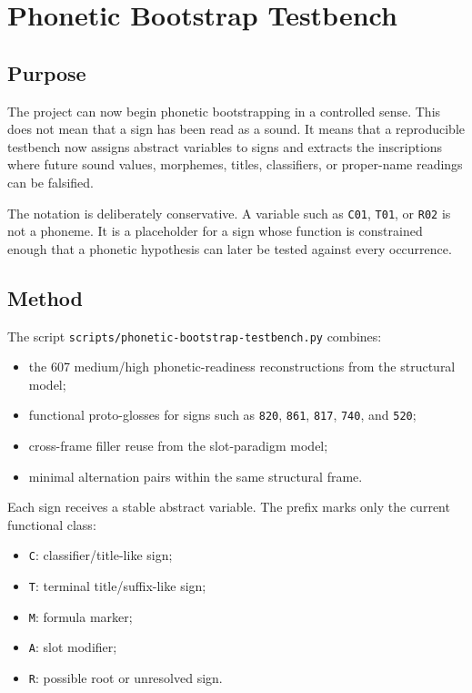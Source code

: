 \section{Phonetic Bootstrap Testbench}

\subsection{Purpose}

The project can now begin phonetic bootstrapping in a controlled sense. This does not mean that a sign has been read as a sound. It means that a reproducible testbench now assigns abstract variables to signs and extracts the inscriptions where future sound values, morphemes, titles, classifiers, or proper-name readings can be falsified.

The notation is deliberately conservative. A variable such as \texttt{C01}, \texttt{T01}, or \texttt{R02} is not a phoneme. It is a placeholder for a sign whose function is constrained enough that a phonetic hypothesis can later be tested against every occurrence.

\subsection{Method}

The script \texttt{scripts/phonetic-bootstrap-testbench.py} combines:

\begin{itemize}
  \item the 607 medium/high phonetic-readiness reconstructions from the structural model;
  \item functional proto-glosses for signs such as \texttt{820}, \texttt{861}, \texttt{817}, \texttt{740}, and \texttt{520};
  \item cross-frame filler reuse from the slot-paradigm model;
  \item minimal alternation pairs within the same structural frame.
\end{itemize}

Each sign receives a stable abstract variable. The prefix marks only the current functional class:

\begin{itemize}
  \item \texttt{C}: classifier/title-like sign;
  \item \texttt{T}: terminal title/suffix-like sign;
  \item \texttt{M}: formula marker;
  \item \texttt{A}: slot modifier;
  \item \texttt{R}: possible root or unresolved sign.
\end{itemize}

